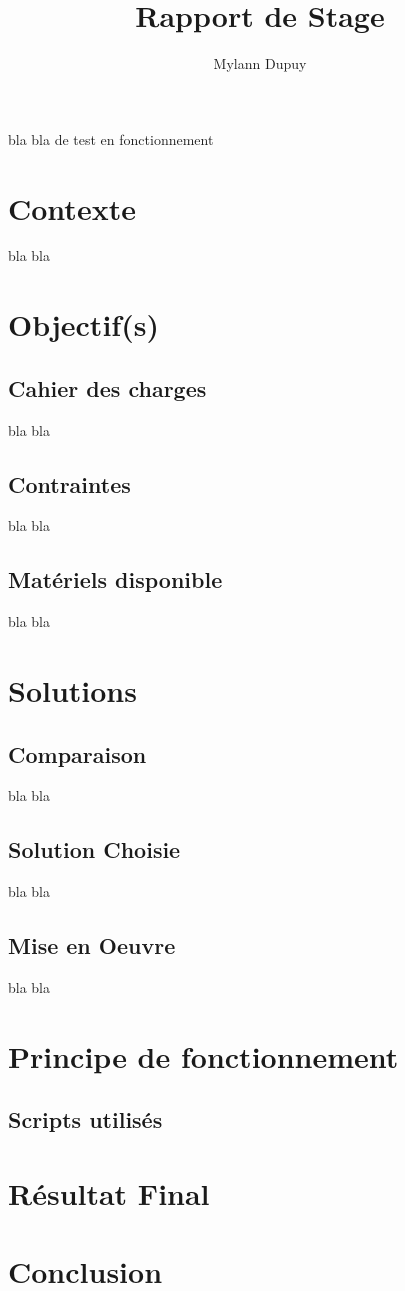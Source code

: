 \documentclass[11pt,a4paper,oneside]{article}
\author{Mylann Dupuy}
\title{Rapport de Stage}
\begin{document}
bla bla de test en fonctionnement
\newpage
\tableofcontents
\newpage
\section{Contexte}
bla bla
\section{Objectif(s)}
\subsection{Cahier des charges}
bla bla
\\
\subsection{Contraintes}
bla bla
\\
\subsection{Matériels disponible}
bla bla
\\
\section{Solutions}
\subsection{Comparaison}
bla bla
\\
\subsection{Solution Choisie}
bla bla
\\
\subsection{Mise en Oeuvre}
bla bla
\\
\section{Principe de fonctionnement}
\subsection{Scripts utilisés}
\section{Résultat Final}
\section{Conclusion}
\end{document}
